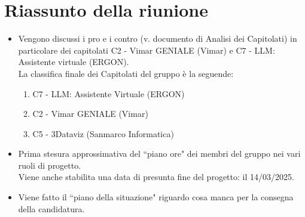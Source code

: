 \section{Riassunto della riunione}
\begin{itemize}
    \item Vengono discussi i pro e i contro (v. documento di Analisi dei Capitolati) in particolare dei capitolati C2 - Vimar GENIALE (Vimar) e C7 - LLM: Assistente virtuale (ERGON).\\
    La classifica finale dei Capitolati del gruppo è la seguende:
        \begin{enumerate}
            \item C7 - LLM: Assistente Virtuale (ERGON)
            \item C2 - Vimar GENIALE (Vimar)
            \item C5 - 3Dataviz (Sanmarco Informatica)
        \end{enumerate}  
    \item Prima stesura approssimativa del ``piano ore" dei membri del gruppo nei vari ruoli di progetto.\\
    Viene anche stabilita una data di presunta fine del progetto: il 14/03/2025.
    \item Viene fatto il ``piano della situazione" riguardo cosa manca per la consegna della candidatura.
\end{itemize}


